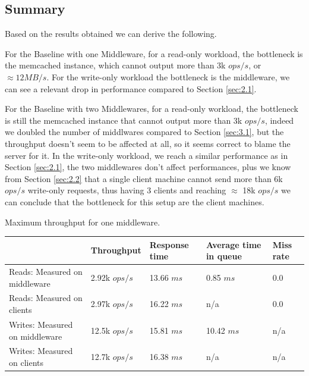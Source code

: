 \documentclass[11pt,a4paper]{article}
\begin{document}
\subsection{Summary}

Based on the results obtained we can derive the following.

For the Baseline with one Middleware, for a read-only workload, the bottleneck is the memcached instance, which cannot output more than 3k $ops/s$, or $\approx 12 MB/s$.
For the write-only workload the bottleneck is the middleware, we can see a relevant drop in performance compared to Section \ref{sec:2.1}.

For the Baseline with two Middlewares, for a read-only workload, the bottleneck is still the memcached instance that cannot output more than 3k $ops/s$, indeed we doubled the number of middlwares compared to Section \ref{sec:3.1}, but the throughput doesn't seem to be affected at all, so it seems correct to blame the server for it.
In the write-only workload, we reach a similar performance as in Section \ref{sec:2.1}, the two middlewares don't affect performances, plus we know from Section \ref{sec:2.2} that a single client machine cannot send more than 6k $ops/s$ write-only requests, thus having 3 clients and reaching $\approx$ 18k $ops/s$ we can conclude that the bottleneck for this setup are the client machines.

\begin{center}
	{Maximum throughput for one middleware.}
	\begin{tabular}{|l|p{2cm}|p{2cm}|p{2cm}|p{2cm}|}
		\hline                                & Throughput & Response time & Average time in queue & Miss rate \\ 
		\hline Reads: Measured on middleware  & 2.92k $ops/s$ & 13.66 $ms$ & 0.85 $ms$ & 0.0 \\ 
        \hline Reads: Measured on clients     & 2.97k $ops/s$ & 16.22 $ms$ & n/a  & 0.0 \\ 
        \hline Writes: Measured on middleware & 12.5k $ops/s$ & 15.81 $ms$ & 10.42 $ms$ & n/a       \\ 
        \hline Writes: Measured on clients    & 12.7k $ops/s$ & 16.38 $ms$ & n/a & n/a       \\ 
		\hline 
	\end{tabular}
\end{center}
\end{document}
